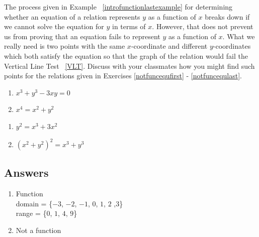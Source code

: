The process given in Example \hspace{-.1in} ~\ref{introfunctionlastexample} for determining whether an equation of a relation represents $y$ as a function of $x$ breaks down if we cannot solve the equation for $y$ in terms of $x$.  However, that does not prevent us from proving that an equation fails to represent $y$ as a function of $x$.  What we really need is two points with the same $x$-coordinate and different $y$-coordinates which both satisfy the equation so that the graph of the relation would fail the Vertical Line Test \hspace{-.1in} ~\ref{VLT}.  Discuss with your classmates how you might find such points for the relations given in Exercises \ref{notfuncequfirst} - \ref{notfuncequlast}.

\begin{multicols}{2}
\begin{enumerate}
\setcounter{enumi}{\value{HW}}

\item $x^{3} + y^{3} - 3xy = 0$ \label{notfuncequfirst}
\item $x^{4} = x^{2} + y^{2}$ 

\setcounter{HW}{\value{enumi}}
\end{enumerate}
\end{multicols}

\begin{multicols}{2}
\begin{enumerate}
\setcounter{enumi}{\value{HW}}


\item $y^{2} = x^{3} + 3x^{2}$ 
\item $(x^{2} + y^{2})^{2} = x^{3} + y^{3}$ \label{notfuncequlast}

\setcounter{HW}{\value{enumi}}
\end{enumerate}
\end{multicols}

\newpage

\subsection{Answers}

\begin{multicols}{2}
\begin{enumerate}

\item Function \\ domain = \{$-3$, $-2$, $-1$, $0$, $1$, $2$ ,$3$\} \\ range = \{$0$, $1$, $4$, $9$\}

\vfill

\columnbreak

\item Not a function

\setcounter{HW}{\value{enumi}}
\end{enumerate}
\end{multicols}

